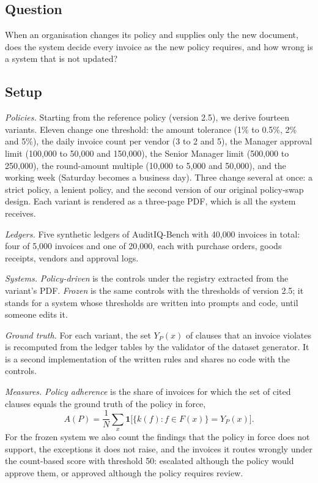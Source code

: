 \documentclass[conference]{IEEEtran}
\begin{document}
\subsection{Question}
When an organisation changes its policy and supplies only the new document, does the system decide every invoice as the new policy requires, and how wrong is a system that is not updated?

\subsection{Setup}
\textit{Policies.} Starting from the reference policy (version 2.5), we derive fourteen variants. Eleven change one threshold: the amount tolerance (1\% to 0.5\%, 2\% and 5\%), the daily invoice count per vendor (3 to 2 and 5), the Manager approval limit (100{,}000 to 50{,}000 and 150{,}000), the Senior Manager limit (500{,}000 to 250{,}000), the round-amount multiple (10{,}000 to 5{,}000 and 50{,}000), and the working week (Saturday becomes a business day). Three change several at once: a strict policy, a lenient policy, and the second version of our original policy-swap design. Each variant is rendered as a three-page PDF, which is all the system receives.

\textit{Ledgers.} Five synthetic ledgers of AuditIQ-Bench with 40{,}000 invoices in total: four of 5{,}000 invoices and one of 20{,}000, each with purchase orders, goods receipts, vendors and approval logs.

\textit{Systems.} \emph{Policy-driven} is the controls under the registry extracted from the variant's PDF. \emph{Frozen} is the same controls with the thresholds of version 2.5; it stands for a system whose thresholds are written into prompts and code, until someone edits it.

\textit{Ground truth.} For each variant, the set $Y_P(x)$ of clauses that an invoice violates is recomputed from the ledger tables by the validator of the dataset generator. It is a second implementation of the written rules and shares no code with the controls.

\textit{Measures.} \emph{Policy adherence} is the share of invoices for which the set of cited clauses equals the ground truth of the policy in force,
\begin{equation}
A(P)=\frac{1}{N}\sum_{x}\mathbf{1}\bigl[\{k(f):f\in F(x)\}=Y_P(x)\bigr].
\label{eq:adherence}
\end{equation}
For the frozen system we also count the findings that the policy in force does not support, the exceptions it does not raise, and the invoices it routes wrongly under the count-based score with threshold 50: escalated although the policy would approve them, or approved although the policy requires review.
\end{document}
